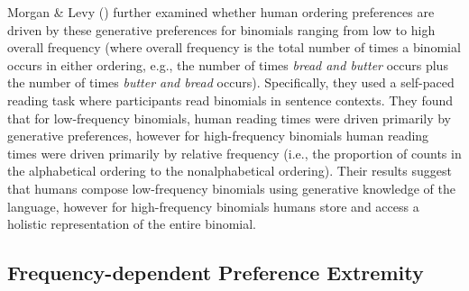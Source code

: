 \documentclass[
  12pt,
]{scrartcl}
\begin{document}
Morgan \& Levy ()
further examined whether human ordering preferences are driven by these
generative preferences for binomials ranging from low to high overall
frequency (where overall frequency is the total number of times a
binomial occurs in either ordering, e.g., the number of times
\emph{bread and butter} occurs plus the number of times \emph{butter and
bread} occurs). Specifically, they used a self-paced reading task where
participants read binomials in sentence contexts. They found that for
low-frequency binomials, human reading times were driven primarily by
generative preferences, however for high-frequency binomials human
reading times were driven primarily by relative frequency (i.e., the
proportion of counts in the alphabetical ordering to the nonalphabetical
ordering). Their results suggest that humans compose low-frequency
binomials using generative knowledge of the language, however for
high-frequency binomials humans store and access a holistic
representation of the entire binomial.

\subsection{Frequency-dependent Preference
Extremity}\label{frequency-dependent-preference-extremity}
\end{document}
